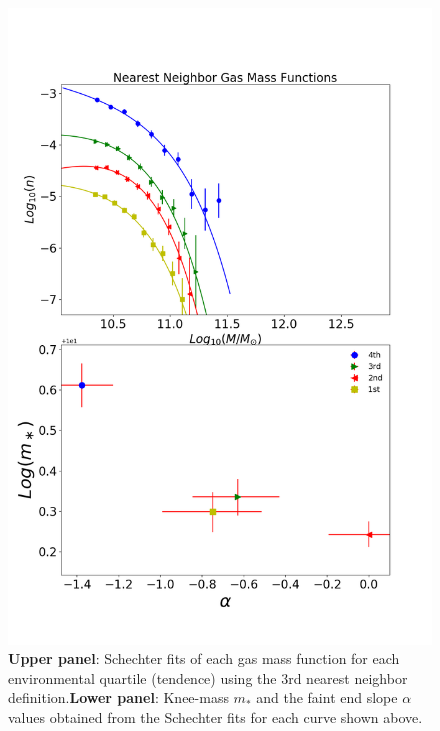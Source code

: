 \documentclass[a4paper,fleqn,usenatbib]{mnras}
\begin{document}
\begin{figure}
	\includegraphics[width=\columnwidth]{./pics/F19_quartilesGas.png}
    \caption{\textbf{Upper panel}: Schechter fits of each gas mass
      function for each environmental quartile (tendence) using the 3rd nearest
      neighbor definition.\textbf{Lower panel}: Knee-mass $m_\ast$ and
      the faint end slope $\alpha$ values obtained from the Schechter
      fits for each curve shown above.} 
    \label{fig:quartilesGas}
\end{figure}
\end{document}
